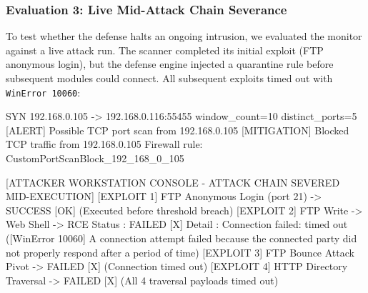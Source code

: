 \subsubsection{Evaluation 3: Live Mid-Attack Chain Severance}
To test whether the defense halts an ongoing intrusion, we evaluated the monitor against a live
attack run. The scanner completed its initial exploit (FTP anonymous login), but the defense
engine injected a quarantine rule before subsequent modules could connect. All subsequent exploits
timed out with \texttt{WinError 10060}:

\begin{logbox}
  SYN 192.168.0.105 -> 192.168.0.116:55455  window_count=10  distinct_ports=5
  [ALERT] Possible TCP port scan from 192.168.0.105
  [MITIGATION] Blocked TCP traffic from 192.168.0.105
               Firewall rule: CustomPortScanBlock_192_168_0_105

[ATTACKER WORKSTATION CONSOLE - ATTACK CHAIN SEVERED MID-EXECUTION]
  [EXPLOIT 1] FTP Anonymous Login (port 21) -> SUCCESS [OK] (Executed before threshold breach)
  [EXPLOIT 2] FTP Write -> Web Shell -> RCE
    Status : FAILED [X]
    Detail : Connection failed: timed out ([WinError 10060] A connection attempt failed because
             the connected party did not properly respond after a period of time)
  [EXPLOIT 3] FTP Bounce Attack Pivot -> FAILED [X] (Connection timed out)
  [EXPLOIT 4] HTTP Directory Traversal -> FAILED [X] (All 4 traversal payloads timed out)
\end{logbox}
